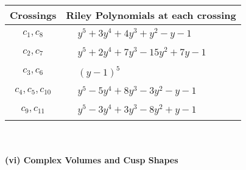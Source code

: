 \documentclass[1p]{elsarticle_modified}
\theoremstyle{definition}
\begin{document}
\begin{tabular}{m{50pt}|m{274pt}}
Crossings & \hspace{64pt}Riley Polynomials at each crossing \\
\hline $$\begin{aligned}c_{1},c_{8}\end{aligned}$$&$\begin{aligned}
&y^5+3 y^4+4 y^3+y^2- y-1
\end{aligned}$\\
\hline $$\begin{aligned}c_{2},c_{7}\end{aligned}$$&$\begin{aligned}
&y^5+2 y^4+7 y^3-15 y^2+7 y-1
\end{aligned}$\\
\hline $$\begin{aligned}c_{3},c_{6}\end{aligned}$$&$\begin{aligned}
&(y-1)^5
\end{aligned}$\\
\hline $$\begin{aligned}c_{4},c_{5},c_{10}\end{aligned}$$&$\begin{aligned}
&y^5-5 y^4+8 y^3-3 y^2- y-1
\end{aligned}$\\
\hline $$\begin{aligned}c_{9},c_{11}\end{aligned}$$&$\begin{aligned}
&y^5-3 y^4+3 y^3-8 y^2+y-1
\end{aligned}$\\
\hline
\end{tabular}\\~\\
\newpage\flushleft \textbf{(vi) Complex Volumes and Cusp Shapes}
\end{document}
